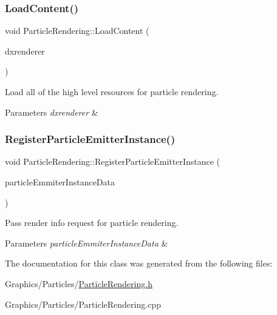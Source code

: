 \subsubsection{\texorpdfstring{Load\+Content()}{LoadContent()}}
{\footnotesize\ttfamily void Particle\+Rendering\+::\+Load\+Content (\begin{DoxyParamCaption}\item[{\hyperlink{classDXRenderer}{D\+X\+Renderer} $\ast$}]{dxrenderer }\end{DoxyParamCaption})}



Load all of the high level resources for particle rendering. 


\begin{DoxyParams}{Parameters}
{\em dxrenderer} & \\
\hline
\end{DoxyParams}
\mbox{\label{classParticleRendering_a766307f91238afe4da6af25b858f472b}} 
\subsubsection{\texorpdfstring{Register\+Particle\+Emitter\+Instance()}{RegisterParticleEmitterInstance()}}
{\footnotesize\ttfamily void Particle\+Rendering\+::\+Register\+Particle\+Emitter\+Instance (\begin{DoxyParamCaption}\item[{const \hyperlink{structParticleEmitterInstanceData}{Particle\+Emitter\+Instance\+Data} \&}]{particle\+Emmiter\+Instance\+Data }\end{DoxyParamCaption})}



Pass render info request for particle rendering. 


\begin{DoxyParams}{Parameters}
{\em particle\+Emmiter\+Instance\+Data} & \\
\hline
\end{DoxyParams}


The documentation for this class was generated from the following files\+:\begin{DoxyCompactItemize}
\item 
Graphics/\+Particles/\hyperlink{ParticleRendering_8h}{Particle\+Rendering.\+h}\item 
Graphics/\+Particles/Particle\+Rendering.\+cpp\end{DoxyCompactItemize}
